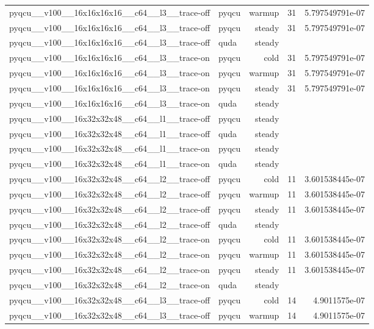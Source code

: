 \begin{table}[htbp]
\begin{tabular}{@{}llrrr@{}}
pyqcu\_\_v100\_\_16x16x16x16\_\_c64\_\_l3\_\_trace-off & pyqcu & warmup & 31 & 5.797549791e-07 \\
pyqcu\_\_v100\_\_16x16x16x16\_\_c64\_\_l3\_\_trace-off & pyqcu & steady & 31 & 5.797549791e-07 \\
pyqcu\_\_v100\_\_16x16x16x16\_\_c64\_\_l3\_\_trace-off & quda & steady &  &  \\
pyqcu\_\_v100\_\_16x16x16x16\_\_c64\_\_l3\_\_trace-on & pyqcu & cold & 31 & 5.797549791e-07 \\
pyqcu\_\_v100\_\_16x16x16x16\_\_c64\_\_l3\_\_trace-on & pyqcu & warmup & 31 & 5.797549791e-07 \\
pyqcu\_\_v100\_\_16x16x16x16\_\_c64\_\_l3\_\_trace-on & pyqcu & steady & 31 & 5.797549791e-07 \\
pyqcu\_\_v100\_\_16x16x16x16\_\_c64\_\_l3\_\_trace-on & quda & steady &  &  \\
pyqcu\_\_v100\_\_16x32x32x48\_\_c64\_\_l1\_\_trace-off & pyqcu & steady &  &  \\
pyqcu\_\_v100\_\_16x32x32x48\_\_c64\_\_l1\_\_trace-off & quda & steady &  &  \\
pyqcu\_\_v100\_\_16x32x32x48\_\_c64\_\_l1\_\_trace-on & pyqcu & steady &  &  \\
pyqcu\_\_v100\_\_16x32x32x48\_\_c64\_\_l1\_\_trace-on & quda & steady &  &  \\
pyqcu\_\_v100\_\_16x32x32x48\_\_c64\_\_l2\_\_trace-off & pyqcu & cold & 11 & 3.601538445e-07 \\
pyqcu\_\_v100\_\_16x32x32x48\_\_c64\_\_l2\_\_trace-off & pyqcu & warmup & 11 & 3.601538445e-07 \\
pyqcu\_\_v100\_\_16x32x32x48\_\_c64\_\_l2\_\_trace-off & pyqcu & steady & 11 & 3.601538445e-07 \\
pyqcu\_\_v100\_\_16x32x32x48\_\_c64\_\_l2\_\_trace-off & quda & steady &  &  \\
pyqcu\_\_v100\_\_16x32x32x48\_\_c64\_\_l2\_\_trace-on & pyqcu & cold & 11 & 3.601538445e-07 \\
pyqcu\_\_v100\_\_16x32x32x48\_\_c64\_\_l2\_\_trace-on & pyqcu & warmup & 11 & 3.601538445e-07 \\
pyqcu\_\_v100\_\_16x32x32x48\_\_c64\_\_l2\_\_trace-on & pyqcu & steady & 11 & 3.601538445e-07 \\
pyqcu\_\_v100\_\_16x32x32x48\_\_c64\_\_l2\_\_trace-on & quda & steady &  &  \\
pyqcu\_\_v100\_\_16x32x32x48\_\_c64\_\_l3\_\_trace-off & pyqcu & cold & 14 & 4.9011575e-07 \\
pyqcu\_\_v100\_\_16x32x32x48\_\_c64\_\_l3\_\_trace-off & pyqcu & warmup & 14 & 4.9011575e-07 \\

\end{tabular}
\end{table}
